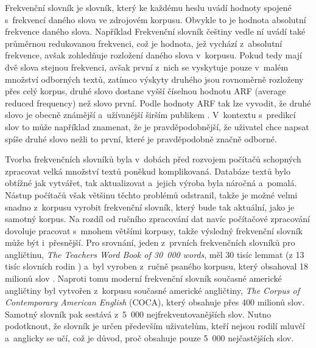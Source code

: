 \documentclass[a4paper,11pt,openany]{book} %
\begin{document}
Frekvenční slovník je slovník, který ke každému heslu uvádí hodnoty spojené s~frekvencí daného slova ve zdrojovém korpusu. Obvykle to je hodnota absolutní frekvence daného slova. Například Frekvenční slovník češtiny %
vedle ní uvádí také průměrnou redukovanou frekvenci, což je hodnota, jež vychází z~absolutní frekvence, avšak zohledňuje rozložení daného slova v~korpusu. Pokud tedy mají dvě slova stejnou frekvenci, avšak první z~nich se vyskytuje pouze v~malém množství odborných textů, zatímco výskyty druhého jsou rovnoměrně rozloženy přes celý korpus, druhé slovo dostane vyšší číselnou hodnotu ARF (average reduced frequency) než slovo první. Podle hodnoty ARF tak lze vyvodit, že druhé slovo je obecně známější a~užívanější širším publikem \parencite{vcermak2004frekvenvcni}. %
V~kontextu s~predikcí slov to může například znamenat, že je pravděpodobnější, že uživatel chce napsat spíše druhé slovo nežli to první, které je pravděpodobně značně odborné.


Tvorba frekvenčních slovníků byla v~dobách před rozvojem počítačů schopných zpracovat velká množství textů poněkud komplikovaná. Databáze textů bylo obtížné jak vytvářet, tak aktualizovat a~jejich výroba byla náročná a~pomalá. Nástup počítačů však většinu těchto problémů odstranil, takže je možné velmi snadno z~korpusu vyrobit frekvenční slovník, který bude tak aktuální, jako je samotný korpus. Na rozdíl od ručního zpracování dat navíc počítačové zpracování dovoluje pracovat s~mnohem většími korpusy, takže výsledný frekvenční slovník může být i~přesnější. Pro srovnání, jeden z~prvních frekvenčních slovníků pro angličtinu, {\it The Teachers Word Book of 30~000 words}, měl 30 tisíc lemmat (z 13 tisíc slovních rodin \parencite{lorge1944teacher}%
) a~byl vyroben z~ručně psaného korpusu, který obsahoval 18 milionů slov \parencite{nation1997vocabulary}. %
Naproti tomu moderní frekvenční slovník současné americké angličtiny \parencite{davies2013frequency} byl vytvořen z~korpusu současné americké angličtiny, {\it The Corpus of Contemporary American English} (COCA), který obsahuje přes 400 milionů slov. Samotný slovník pak sestává z~5~000 nejfrekventovanějších slov. Nutno podotknout, že slovník je určen především uživatelům, kteří nejsou rodilí mluvčí a~anglicky se učí, což je důvod, proč obsahuje pouze 5~000 nejčastějších slov.
\end{document}
